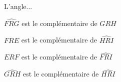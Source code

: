 \begin{QCM}
\begin{GroupeQCM}
\begin{exercice}\label{Aqcm2}
L'angle...
\begin{ChoixQCM}{2}
\item $\widehat{FRG}$ est le complémentaire de $\widehat{GRH}$
\item $\widehat{FRE}$ est le complémentaire de $\widehat{HRI}$
\item $\widehat{ERF}$ est le complémentaire de $\widehat{FRI}$
\item $\widehat{GRH}$ est le complémentaire de $\widehat{HRI}$
\end{ChoixQCM}
\begin{corrige}
\end{corrige}
\end{exercice}
\end{GroupeQCM}
\end{QCM}

